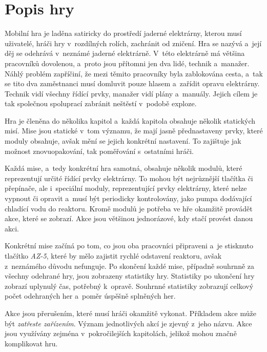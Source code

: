\section{Popis hry}

Mobilní hra je laděna satiricky do prostředí jaderné elektrárny,
kterou musí uživatelé,
hráči hry v~rozdílných rolích,
zachránit od zničení.
Hra se nazývá \emph{\myAppName}
a~její děj se odehrává v~neznámé jaderné elektrárně.
V~této elektrárně má většina pracovníků dovolenou,
a~proto jsou přítomni jen dva lidé,
technik a~manažer.
Náhlý problém zapříčiní,
že mezi těmito pracovníky byla zablokována cesta,
a~tak se tito dva zaměstnanci musí domluvit pouze hlasem
a~zařídit opravu elektrárny.
Technik vidí všechny řídící prvky,
manažer vidí plány a~manuály.
Jejich cílem je tak společnou spoluprací zabránit neštěstí v~podobě exploze. 

Hra je členěna do několika kapitol
a~každá kapitola obsahuje několik statických misí.
Mise jsou statické v~tom významu,
že mají jasně přednastaveny prvky,
které moduly obsahuje,
avšak mění se jejich konkrétní nastavení.
To zajištuje jak možnost znovuopakování,
tak poměřování s~ostatními hráči.

Každá mise,
a~tedy konkrétní hra samotná,
obsahuje několik modulů,
které reprezentují určité řídící prvky elektrárny.
To mohou být nejrůznější tlačítka či přepínače,
ale i~speciální moduly,
reprezentující prvky elektrárny,
které nelze vypnout či opravit a~musí být periodicky kontrolovány,
jako pumpa dodávající chladící vodu do reaktoru.
Kromě modulů je potřeba ve hře okamžitě provádět akce,
které se zobrazí.
Akce jsou většinou jednorázové,
kdy stačí provést danou akci.

Konkrétní mise začíná po tom,
co jsou oba pracovníci připraveni
a~je stisknuto tlačítko \emph{AZ-5},
které by mělo zajistit rychlé odstavení reaktoru,
avšak z~neznámého důvodu nefunguje.
Po skončení každé mise,
případně souhrnně za všechny odehrané hry,
jsou zobrazeny statistiky hry.
Statistiky po ukončení hry zobrazí uplynulý čas,
potřebný k~opravě.
Souhrnné statistiky zobrazují
celkový počet odehraných her a~poměr úspěšně splněných her.

Akce jsou přerušením,
které musí hráči okamžitě vykonat.
Příkladem akce může být \emph{zatřeste zařízením}.
Význam jednotlivých akcí je zjevný z~jeho názvu.
Akce jsou využívány zejména v~pokročilejších kapitolách,
jelikož mohou značně komplikovat hru.
